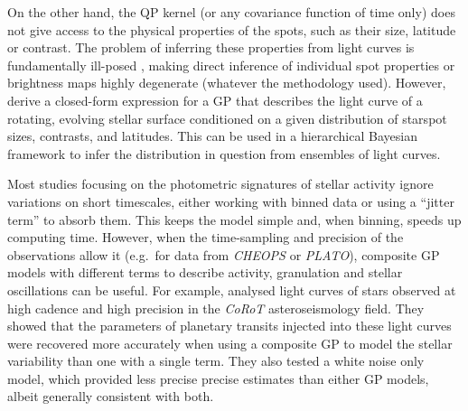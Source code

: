 \documentclass[letterpaper]{ar-1col}
\begin{document}
On the other hand, the QP kernel (or any covariance function of time only) does not give access to the physical properties of the spots, such as their size, latitude or contrast. The problem of inferring these properties from light curves is fundamentally ill-posed \citep{2021AJ....162..123L}, making direct inference of individual spot properties or brightness maps highly degenerate (whatever the methodology used). However, \citet{2021AJ....162..124L} derive a closed-form expression for a GP that describes the light curve of a rotating, evolving stellar surface conditioned on a given distribution of starspot sizes, contrasts, and latitudes. This can be used in a hierarchical Bayesian framework to infer the distribution in question from ensembles of light curves. 

Most studies focusing on the photometric signatures of stellar activity ignore variations on short timescales, either working with binned data or using a ``jitter term'' to absorb them. This keeps the model simple and, when binning, speeds up computing time. However, when the time-sampling and precision of the observations allow it (e.g.\ for data from \textit{CHEOPS} or \textit{PLATO}), composite GP models with different terms to describe activity, granulation and stellar oscillations can be useful. For example, \citet{2020A&A...634A..75B} analysed light curves of stars observed at high cadence and high precision in the \textit{CoRoT} asteroseismology field. They showed that the parameters of planetary transits injected into these light curves were recovered more accurately when using a composite GP to model the stellar variability than one with a single term. They also tested a white noise only model, which provided less precise precise estimates than either GP models, albeit generally consistent with both. 
\end{document}
